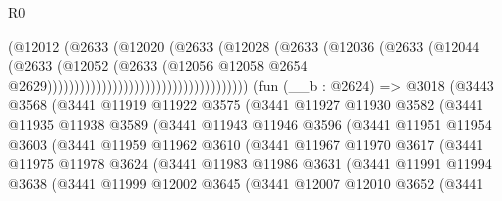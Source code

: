 \begin{lexlean}{R0}
\begin{coremodule}
                                                    (@12012
                                                      (@2633
                                                        (@12020
                                                          (@2633
                                                            (@12028
                                                              (@2633
                                                                (@12036
                                                                  (@2633
                                                                    (@12044
                                                                      (@2633
                                                                        (@12052
                                                                          (@2633
                                                                            (@12056
                                                                              @12058
                                                                              @2654
                                                                              @2629)))))))))))))))))))))))))))))))))))))
    (fun (__b : @2624) =>
    @3018
      (@3443
        @3568
        (@3441
          @11919
          @11922
          @3575
          (@3441
            @11927
            @11930
            @3582
            (@3441
              @11935
              @11938
              @3589
              (@3441
                @11943
                @11946
                @3596
                (@3441
                  @11951
                  @11954
                  @3603
                  (@3441
                    @11959
                    @11962
                    @3610
                    (@3441
                      @11967
                      @11970
                      @3617
                      (@3441
                        @11975
                        @11978
                        @3624
                        (@3441
                          @11983
                          @11986
                          @3631
                          (@3441
                            @11991
                            @11994
                            @3638
                            (@3441
                              @11999
                              @12002
                              @3645
                              (@3441
                                @12007
                                @12010
                                @3652
                                (@3441

\end{coremodule}
\end{lexlean}

